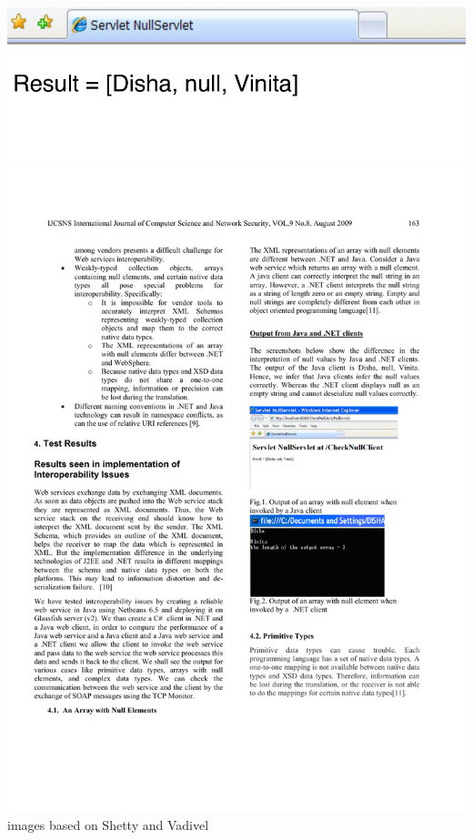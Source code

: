 \documentclass{beamer}
\newcommand{\linespace}{\vskip 0.25cm}
\begin{document}
\begin{frame}
\begin{columns}
  \begin{column}{0.5\textwidth}
  \includegraphics[scale=0.35]{graphics/modifiedJavaNull.pdf}
  \linespace
  \includegraphics[scale=0.9]{graphics/NETNullSmall.pdf}
  \\ \tiny{images based on Shetty and Vadivel\cite{Shetty:2009}}
  \end{column}
  \end{columns}
\end{frame}
\end{document}
